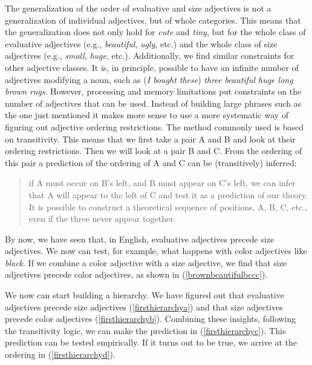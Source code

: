 \noindent The generalization of the order of evaluative and size adjectives is not a generalization of individual adjectives, but of whole categories. This means that the generalization does not only hold for \textit{cute} and \textit{tiny}, but for the whole class of evaluative adjectives (e.g., \textit{beautiful}, \textit{ugly}, etc.) and the whole class of size adjectives (e.g., \textit{small}, \textit{huge}, etc.). Additionally, we find similar constraints for other adjective classes. 
It is, in principle, possible to have an infinite number of adjectives modifying a noun, such as (\textit{I bought these}) \textit{three beautiful huge long brown rugs}. However, processing and memory limitations put constraints on the number of adjectives that can be used. Instead of building large phrases such as the one just mentioned it makes more sense to use a more systematic way of figuring out adjective ordering restrictions. The method commonly used is based on transitivity. This means that we first take a pair A and B and look at their ordering restrictions. Then we will look at a pair B and C. From the ordering of this pair a prediction of the ordering of A and C can be (transitively) inferred: 

\begin{quote} if A must occur on B's left, and B must appear on C's left, we can infer that A will appear to the left of C and test it as a prediction of our theory. It is possible to construct a theoretical sequence of positions, A, B, C, etc., even if the three never appear together. \citep[42]{beninca2001position}\end{quote}


By now, we have seen that, in English, evaluative adjectives precede size adjectives. We now can test, for example, what happens with color adjectives like \textit{black}. If we combine a color adjective with a size adjective, we find that size adjectives precede color adjectives, as shown in (\ref{brownbeautifulbccc}).

\begin{exe}
\ex\label{brownbeautifulbccc}\begin{xlist} 
\end{xlist}
\end{exe}

\noindent We now can start building a hierarchy. We have figured out that evaluative adjectives precede size adjectives (\ref{firsthierarchya}) and that size adjectives precede color adjectives (\ref{firsthierarchyb}). Combining these insights, following the transitivity logic, we can make the prediction in (\ref{firsthierarchyc}). This prediction can be tested empirically. If it turns out to be true, we arrive at the ordering in (\ref{firsthierarchyd}).



